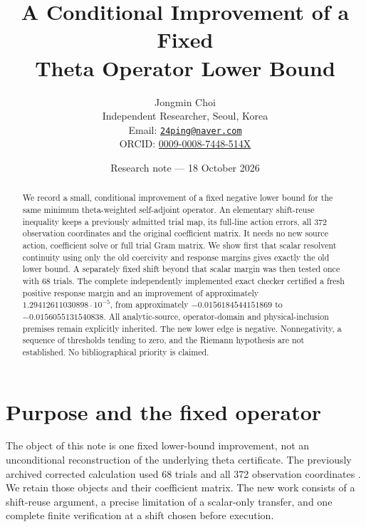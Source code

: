 \documentclass[11pt,a4paper]{article}
\title{A Conditional Improvement of a Fixed\\Theta Operator Lower Bound}
\author{Jongmin Choi\\[2pt]
\small Independent Researcher, Seoul, Korea\\
\small Email: \href{mailto:24ping@naver.com}{\texttt{24ping@naver.com}}\\
\small ORCID: \href{https://orcid.org/0009-0008-7448-514X}{0009-0008-7448-514X}}
\date{Research note --- 18 October 2026}
\theoremstyle{definition}
\theoremstyle{remark}
\numberwithin{equation}{section}
\begin{document}
\maketitle
\begin{abstract}
We record a small, conditional improvement of a fixed negative lower bound
for the same minimum theta-weighted self-adjoint operator.
An elementary shift-reuse inequality keeps a previously admitted trial map,
its full-line action errors, all 372 observation coordinates and the
original coefficient matrix. It needs no new source action, coefficient
solve or full trial Gram matrix. We show first that scalar resolvent
continuity using only the old coercivity and response margins gives
exactly the old lower bound. A separately fixed shift beyond that scalar
margin was then tested once with 68 trials. The complete independently
implemented exact checker certified a fresh positive response margin and
an improvement of approximately \(1.29412611030898\cdot10^{-5}\), from
approximately \(-0.0156184544151869\) to \(-0.0156055131540838\).
All analytic-source, operator-domain and physical-inclusion premises remain
explicitly inherited. The new lower edge is negative. Nonnegativity,
a sequence of thresholds tending to zero, and the Riemann hypothesis are
not established. No bibliographical priority is claimed.
\end{abstract}

\section{Purpose and the fixed operator}\label{sec:setting}

The object of this note is one fixed lower-bound improvement, not an
unconditional reconstruction of the underlying theta certificate.
The previously archived corrected calculation used 68 trials and all
372 observation coordinates \cite{archive}. We retain those objects and
their coefficient matrix. The new work consists of a shift-reuse argument,
a precise limitation of a scalar-only transfer, and one complete finite
verification at a shift chosen before execution.
\end{document}
